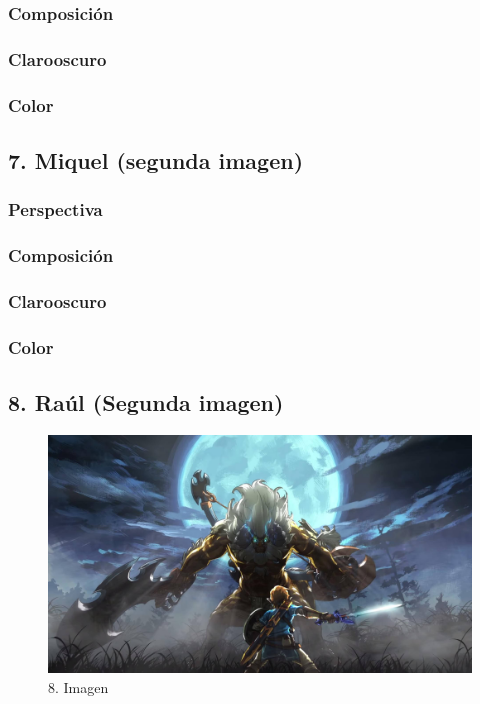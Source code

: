 \documentclass[12pt]{article}
\begin{document}
        \subsubsection{Composición}

        \subsubsection{Clarooscuro}

        \subsubsection{Color}
        \newpage


    \subsection{7. Miquel (segunda imagen)}
        \subsubsection{Perspectiva}

        \subsubsection{Composición}

        \subsubsection{Clarooscuro}

        \subsubsection{Color}
        \newpage

    \subsection{8. Raúl (Segunda imagen)}
    \begin{figure}[H]
      \centering
      \includegraphics[scale=0.25]{images/Concepts/8_concept_art}
      \caption{\small 8. Imagen}
    \end{figure}
\end{document}
